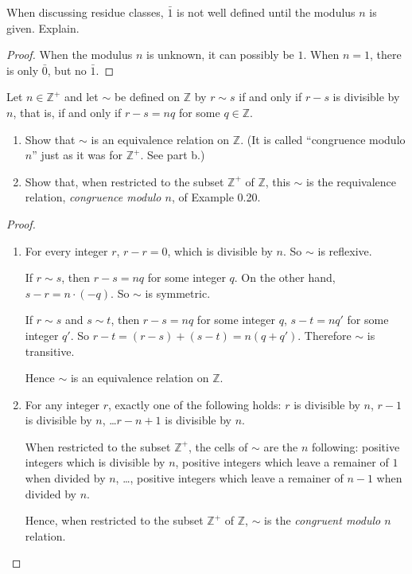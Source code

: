 \begin{exercise}
    When discussing residue classes, $\bar{1}$ is not well defined until the modulus $n$ is given. Explain.
\end{exercise}

\begin{proof}
    When the modulus $n$ is unknown, it can possibly be $1$. When $n = 1$, there is only $\bar{0}$, but no $\bar{1}$.
\end{proof}

\begin{exercise}
    Let $n\in\mathbb{Z}^{+}$ and let $\sim$ be defined on $\mathbb{Z}$ by $r\sim s$ if and only if $r - s$ is divisible by $n$, that is, if and only if $r - s = nq$ for some $q\in\mathbb{Z}$.
    \begin{enumerate}[label={\textbf{\alph*.}},itemsep=0pt]
        \item Show that $\sim$ is an equivalence relation on $\mathbb{Z}$. (It is called ``congruence modulo $n$'' just as it was for $\mathbb{Z}^{+}$. See part b.)
        \item Show that, when restricted to the subset $\mathbb{Z}^{+}$ of $\mathbb{Z}$, this $\sim$ is the requivalence relation, \textit{congruence modulo $n$}, of Example 0.20.
    \end{enumerate}
\end{exercise}

\begin{proof}
    \begin{enumerate}
        \item For every integer $r$, $r - r = 0$, which is divisible by $n$. So $\sim$ is reflexive.

              If $r\sim s$, then $r - s = nq$ for some integer $q$. On the other hand, $s - r = n\cdot (-q)$. So $\sim$ is symmetric.

              If $r\sim s$ and $s\sim t$, then $r - s = nq$ for some integer $q$, $s - t = nq'$ for some integer $q'$. So $r - t = (r - s) + (s - t) = n(q + q')$. Therefore $\sim$ is transitive.

              Hence $\sim$ is an equivalence relation on $\mathbb{Z}$.
        \item For any integer $r$, exactly one of the following holds: $r$ is divisible by $n$, $r - 1$ is divisible by $n$, \ldots $r - n + 1$ is divisible by $n$.

              When restricted to the subset $\mathbb{Z}^{+}$, the cells of $\sim$ are the $n$ following: positive integers which is divisible by $n$, positive integers which leave a remainer of $1$ when divided by $n$, \ldots, positive integers which leave a remainer of $n-1$ when divided by $n$.

              Hence, when restricted to the subset $\mathbb{Z}^{+}$ of $\mathbb{Z}$, $\sim$ is the \textit{congruent modulo $n$} relation.
    \end{enumerate}
\end{proof}

